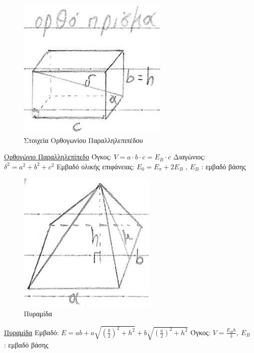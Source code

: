 \documentclass[12pt]{article}
\begin{document}
\begin{flushleft}
	\begin{figure}[H]
	\centering
	\includegraphics[scale=2]{orthParallilepipedo}
	\caption{\textgreek{Στοιχεία Ορθογωνίου Παραλληλεπιπέδου}}
	\label{fig:orthParallilepipedo}
	\end{figure}	
	
	\uline{\textgreek{Ορθογώνιο Παραλληλεπίπεδο}} \linebreak 
	\textbullet \quad \textgreek{Όγκος}: $\displaystyle V = a\cdot b \cdot c = E_B \cdot c$ \linebreak 
	\textbullet \quad \textgreek{Διαγώνιος}: $\displaystyle \delta^2 = a^2 + b^2 + c^2 $ \linebreak 
	\textbullet \quad \textgreek{Εμβαδό ολικής επιφάνειας}: $\displaystyle E_0 = E_\pi + 2E_B$  , $E_B$  :  \textgreek{εμβαδό βάσης} \linebreak
	
	\begin{figure}[H]
	\centering
	\includegraphics[scale=2]{pyramid}
	\caption{\textgreek{Πυραμίδα}}
	\label{fig:pyramid}
	\end{figure}
	
	\uline{\textgreek{Πυραμίδα}} \linebreak 
	\textbullet \quad \textgreek{Εμβαδό}: $\displaystyle E = ab + a\sqrt{\left(\frac{b}{2} \right)^2 + h^2} + b\sqrt{\left(\frac{a}{2}\right)^2 + h^2} $ \linebreak 
	\textbullet \quad \textgreek{Όγκος}: $\displaystyle  V = \frac{E_B h}{3} , \ E_B$  :  \textgreek{εμβαδό βάσης} \linebreak 	
	

\end{flushleft}
\end{document}
